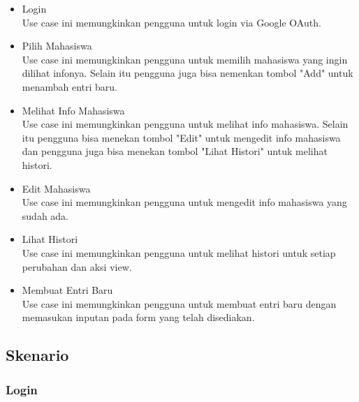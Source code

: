 \begin{itemize}
\item Login\\
Use case ini memungkinkan pengguna untuk login via Google OAuth.
\item Pilih Mahasiswa\\
Use case ini memungkinkan pengguna untuk memilih mahasiswa yang ingin dilihat infonya. Selain itu pengguna juga bisa nemenkan tombol "Add" untuk menambah entri baru.
\item Melihat Info Mahasiswa\\
Use case ini memungkinkan pengguna untuk melihat info mahasiswa. Selain itu pengguna bisa menekan tombol "Edit" untuk mengedit info mahasiswa dan pengguna juga bisa menekan tombol "Lihat Histori" untuk melihat histori.
\item Edit Mahasiswa\\
Use case ini memungkinkan pengguna untuk mengedit info mahasiswa yang sudah ada.
\item Lihat Histori\\
Use case ini memungkinkan pengguna untuk melihat histori untuk setiap perubahan dan aksi view.
\item Membuat Entri Baru\\
Use case ini memungkinkan pengguna untuk membuat entri baru dengan memasukan inputan pada form yang telah disediakan.
\end{itemize}

\subsection{Skenario}
\subsubsection{Login}

